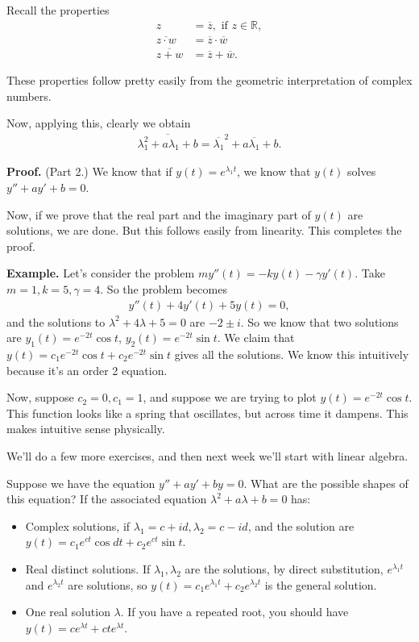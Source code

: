 \documentclass{article}
\newcommand{\RR}{\mathbb{R}}
\newcommand{\ol}{\overline}
\begin{document}
Recall the properties
\begin{align*}
  z &= \ol{z}, \text{ if } z \in \RR, \\
  \ol{z \cdot w} &= \ol{z} \cdot \ol{w} \\
  \ol{z+w} &= \ol{z} + \ol{w}.
\end{align*}

These properties follow pretty easily from the geometric interpretation of complex numbers.

Now, applying this, clearly we obtain
\begin{align*}
  \ol{\lambda_1^2 + a \lambda_1 + b} = \ol{\lambda_1}^2 + a \ol{\lambda_1} + b.
\end{align*}

{\bf Proof.} (Part 2.) We know that if $y(t) = e^{\lambda_1 t}$, we know that $y(t)$ solves $y'' + a y' + b = 0$.

Now, if we prove that the real part and the imaginary part of $y(t)$ are solutions, we are done.  But this follows easily from linearity.  This completes the proof.

{\bf Example.} Let's consider the problem $m y''(t) = -ky(t)  - \gamma y'(t)$.  Take $m=1, k = 5, \gamma = 4$.  So the problem becomes
\begin{align*}
  y''(t) + 4 y'(t) + 5 y(t) = 0, 
\end{align*}
and the solutions to $\lambda^2 + 4 \lambda + 5 = 0$ are $-2 \pm i$.  So we know that two solutions are $y_1(t) = e^{-2t} \cos t$, $y_2(t) = e^{-2t} \sin t$.  We claim that $y(t) = c_1 e^{-2t} \cos t + c_2 e^{-2t} \sin t$ gives all the solutions.  We know this intuitively because it's an order 2 equation.

Now, suppose $c_2 = 0, c_1 = 1$, and suppose we are trying to plot $y(t) = e^{-2t} \cos t$.  This function looks like a spring that oscillates, but across time it dampens.  This makes intuitive sense physically.

We'll do a few more exercises, and then next week we'll start with linear algebra.

Suppose we have the equation $y'' + ay' + by = 0$.  What are the possible shapes of this equation?  If the associated equation $\lambda^2 + a\lambda + b = 0$ has:
\begin{itemize}
  \item Complex solutions, if $\lambda_1 = c+id, \lambda_2 = c - id$, and the solution are $y(t) = c_1 e^{ct} \cos dt + c_2 e^{ct} \sin t$.
  \item Real distinct solutions.  If $\lambda_1, \lambda_2$ are the solutions, by direct substitution, $e^{\lambda_1 t}$ and $e^{\lambda_2 t}$ are solutions, so $y(t) = c_1 e^{\lambda_1 t} + c_2 e^{\lambda_2 t}$ is the general solution. 
  \item One real solution $\lambda$. If you have a repeated root, you should have $y(t) = c e^{\lambda t} + ct e^{\lambda t}$.
\end{itemize}
\end{document}
